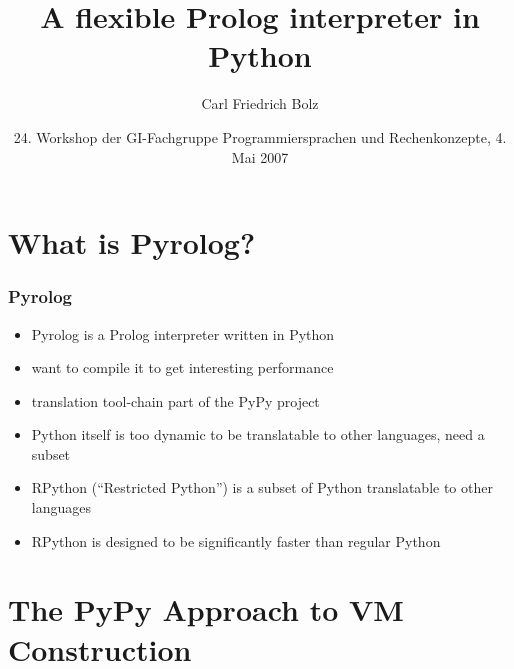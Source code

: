 \documentclass[utf8]{beamer}
\title{A flexible Prolog interpreter in Python}
\author{Carl Friedrich Bolz}
\institute[Heinrich-Heine-Universität Düsseldorf]
{
  Institut für Informatik\\
  Heinrich-Heine-Universität Düsseldorf
}
\date{24. Workshop der GI-Fachgruppe Programmiersprachen und Rechenkonzepte, 4. Mai 2007}
\begin{document}
\begin{frame}
  \titlepage
\end{frame}






\section{What is Pyrolog?}

\begin{frame}
  \frametitle{Pyrolog}

  \begin{itemize}
  \item
    Pyrolog is a Prolog interpreter written in Python
  \item
    want to compile it to get interesting performance
  \item
    translation tool-chain part of the PyPy project
  \item
    Python itself is too dynamic to be translatable to other languages, need a subset
  \item
    RPython (``Restricted Python'') is a subset of Python translatable to other
    languages
  \item
    RPython is designed to be significantly faster than regular Python
  \end{itemize}
\end{frame}

\section{The PyPy Approach to VM Construction}
\end{document}
